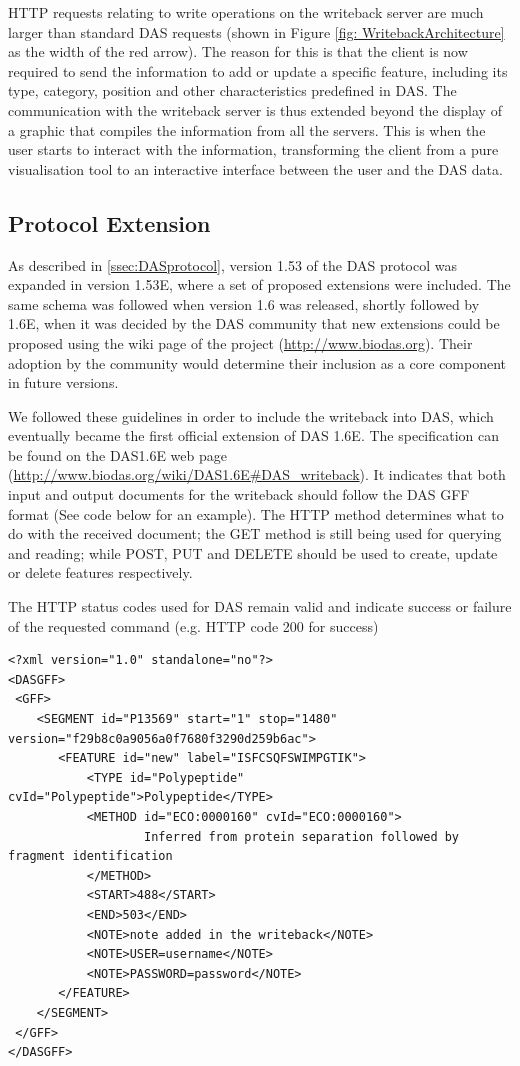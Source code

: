 HTTP requests relating to write operations on the writeback server are much larger than standard DAS requests (shown in Figure \ref{fig: WritebackArchitecture} as the width of the red arrow). The reason for this is that the client is now required to send the information to add or update a specific feature, including its type, category, position and other characteristics predefined in DAS. The communication with the writeback server is thus extended beyond the display of a graphic that compiles the information from all the servers. This is when the user starts to interact with the information, transforming the client from a pure visualisation tool to an interactive interface between the user and the DAS data.

\subsection{Protocol Extension}
As described in \ref{ssec:DASprotocol}, version 1.53 of the DAS protocol was expanded in version 1.53E, where a set of proposed extensions were included. The same schema was followed when version 1.6 was released, shortly followed by 1.6E, when it was decided by the DAS community that new extensions could be proposed using the wiki page of the project (\url{http://www.biodas.org}). Their adoption by the community would determine their inclusion as a core component in future versions.

We followed these guidelines in order to include the writeback into DAS, which eventually became the first official extension of DAS 1.6E. The specification can be found on the DAS1.6E web page (\url{http://www.biodas.org/wiki/DAS1.6E\#DAS\_writeback}). It indicates that both input and output documents for the writeback should follow the DAS GFF format (See code below for an example). The HTTP method determines what to do with the received document; the GET method is still being used for querying and reading; while POST, PUT and DELETE should be used to create, update or delete features respectively.

The HTTP status codes used for DAS remain valid and indicate success or failure of the requested command (e.g. HTTP code 200 for success)

\begin{lstlisting}
<?xml version="1.0" standalone="no"?>
<DASGFF>
 <GFF>
    <SEGMENT id="P13569" start="1" stop="1480" version="f29b8c0a9056a0f7680f3290d259b6ac">
       <FEATURE id="new" label="ISFCSQFSWIMPGTIK">
           <TYPE id="Polypeptide" cvId="Polypeptide">Polypeptide</TYPE>
           <METHOD id="ECO:0000160" cvId="ECO:0000160">
                   Inferred from protein separation followed by fragment identification
           </METHOD>
           <START>488</START>
           <END>503</END>
           <NOTE>note added in the writeback</NOTE>
           <NOTE>USER=username</NOTE>
           <NOTE>PASSWORD=password</NOTE>
       </FEATURE>
    </SEGMENT>
 </GFF>
</DASGFF>
\end{lstlisting}


